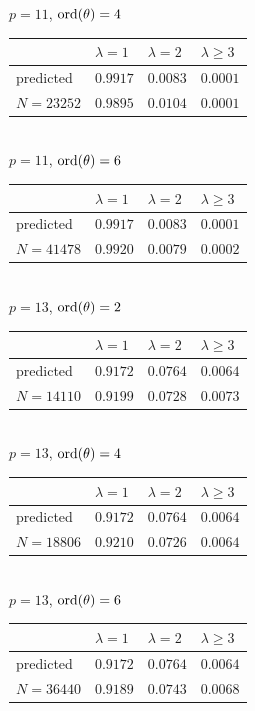 \documentclass[pdflatex,sn-mathphys-num]{sn-jnl}%
\theoremstyle{plain}
\theoremstyle{definition}
\theoremstyle{remark}
\numberwithin{equation}{section}
\newcommand{\ord}{\text{\rm ord}}
\begin{document}
\noindent $p=11$, $\ord(\theta)=4$\\
\begin{tabular}{|l|l|l|l|} \hline
 & $\lambda=1$ & $\lambda=2$ & $\lambda \geq 3$ \\ \hline
predicted & $0.9917$ & $0.0083$ & $0.0001$ \\ \hline
$N=23252$ & $0.9895$ & $0.0104$ & $0.0001$\\ \hline
\end{tabular}\\

\noindent $p=11$, $\ord(\theta)=6$\\
\begin{tabular}{|l|l|l|l|} \hline
 & $\lambda=1$ & $\lambda=2$ & $\lambda \geq 3$ \\ \hline
predicted & $0.9917$ & $0.0083$ & $0.0001$ \\ \hline
$N=41478$ & $0.9920$ & $0.0079$ & $0.0002$\\ \hline
\end{tabular}\\

\noindent $p=13$, $\ord(\theta)=2$\\
\begin{tabular}{|l|l|l|l|} \hline
 & $\lambda=1$ & $\lambda=2$ & $\lambda \geq 3$ \\ \hline
predicted & $0.9172$ & $0.0764$ & $0.0064$ \\ \hline
$N=14110$ & $0.9199$ & $0.0728$ & $0.0073$\\  \hline

\end{tabular}\\


\noindent $p=13$, $\ord(\theta)=4$\\
\begin{tabular}{|l|l|l|l|} \hline
 & $\lambda=1$ & $\lambda=2$ & $\lambda \geq 3$ \\ \hline
predicted & $0.9172$ & $0.0764$ & $0.0064$  \\ \hline
$N=18806$ & $0.9210$ & $0.0726$ & $0.0064$\\ \hline
\end{tabular}\\

\noindent $p=13$, $\ord(\theta)=6$\\
\begin{tabular}{|l|l|l|l|} \hline
 & $\lambda=1$ & $\lambda=2$ & $\lambda \geq 3$ \\ \hline
predicted & $0.9172$ & $0.0764$ & $0.0064$  \\ \hline
$N=36440$ & $0.9189$ & $0.0743$ & $0.0068$ \\ \hline
\end{tabular}\\
\end{document}
